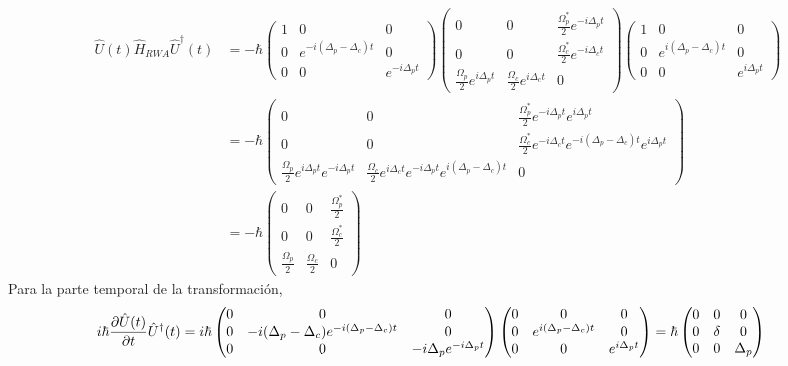\begin{equation}
\begin{split}
\hat{U}(t) \hat{H}_{RWA} \hat{U}^{\dagger}(t) &= - 
\hbar 
\begin{pmatrix}
    1 & 0 & 0 \\
    0 & e^{-i(\Delta_p-\Delta_c) t} & 0 \\
    0 & 0 & e^{-i\Delta_p t}
\end{pmatrix}
\begin{pmatrix}
0 & 0 & \frac{\Omega_p^*}{2} e^{-i \Delta_p t} \\
0 & 0 & \frac{\Omega_c^*}{2} e^{-i \Delta_c t} \\
\frac{\Omega_p}{2} e^{i \Delta_p t} & \frac{\Omega_c}{2} e^{i \Delta_c t} & 0
\end{pmatrix}
\begin{pmatrix}
    1 & 0 & 0 \\
    0 & e^{i(\Delta_p-\Delta_c) t} & 0 \\
    0 & 0 & e^{i\Delta_p t}
\end{pmatrix}\\
&= - \hbar\begin{pmatrix}
0 & 0 & \frac{\Omega_p^*}{2} e^{-i \Delta_p t}  e^{i\Delta_p t} \\
0 & 0 & \frac{\Omega_c^*}{2} e^{-i \Delta_c t} e^{-i(\Delta_p-\Delta_c) t} e^{i\Delta_p t} \\
\frac{\Omega_p}{2} e^{i \Delta_p t} e^{-i\Delta_p t} & \frac{\Omega_c}{2} e^{i \Delta_c t} e^{-i\Delta_p t} e^{i(\Delta_p-\Delta_c) t} & 0
\end{pmatrix}\\
&= - \hbar \begin{pmatrix}
0 & 0 & \frac{\Omega_p^*}{2}  \\
0 & 0 & \frac{\Omega_c^*}{2}  \\
\frac{\Omega_p}{2} & \frac{\Omega_c}{2} & 0
\end{pmatrix}
\end{split}
\end{equation}
Para la parte temporal de la transformación,
\begin{equation}
\begin{split}
    i \hbar \pdv{\hat{U}(t)}{t} \hat{U}^{\dagger}(t) &= i \hbar \begin{pmatrix}
    0 & 0 & 0 \\
    0 & -i(\Delta_p-\Delta_c)e^{-i(\Delta_p- \Delta_c)t} & 0 \\
    0 & 0 &  -i \Delta_p e^{-i \Delta_p t}
    \end{pmatrix} 
    \begin{pmatrix}
    0 & 0 & 0 \\
    0 & e^{i(\Delta_p- \Delta_c)t} & 0 \\
    0 & 0 &  e^{i \Delta_p t}
    \end{pmatrix}
    = \hbar 
    \begin{pmatrix}
    0 & 0 & 0 \\
    0 & \delta & 0 \\
    0 & 0 &  \Delta_p \\
    \end{pmatrix}
\end{split}
\end{equation}
